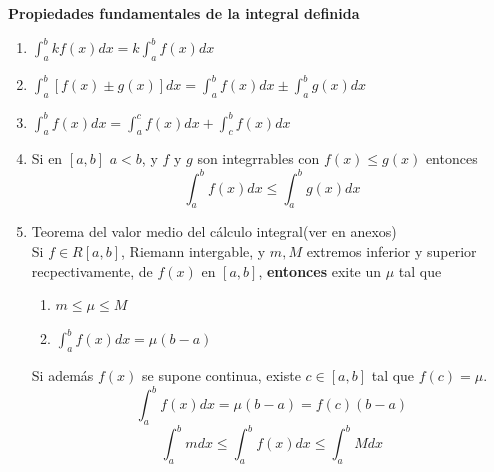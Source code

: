 \documentclass[10pt,twoside]{SelfArx} %
\begin{document}
\textbf{Propiedades fundamentales de la integral definida}\\
\begin{enumerate}
	\item $ \int_{a}^{b}kf(x)dx=k\int_{a}^{b}f(x)dx $
	\item $ \int_{a}^{b}[f(x)\pm g(x)]dx=\int_{a}^{b}f(x)dx\pm \int_{a}^{b}g(x)dx $
	\item $ \int_{a}^{b}f(x)dx=\int_{a}^{c}f(x)dx+\int_{c}^{b}f(x)dx $
	\item  Si en $ [a,b] $ $ a<b $, y $ f $ y $ g $ son integrrables con $ f(x)\leq g(x) $ entonces
	\[ \int_{a}^{b}f(x)dx\leq \int_{a}^{b}g(x)dx \]
	\item Teorema del valor medio del cálculo integral(ver en anexos) \\
	Si $ f\in R[a,b] $, Riemann intergable, y $ m,M $ extremos inferior y superior recpectivamente, de $ f(x) $ en $ [a,b] $,
	\textbf{entonces} exite un $ \mu $ tal que 
	\begin{enumerate}
		\item $ m\leq\mu\leq M $
		\item $ \int_{a}^{b}f(x)dx=\mu(b-a) $
	\end{enumerate}
	Si además $ f(x) $ se supone continua, existe $ c\in[a,b] $ tal que $ f(c)=\mu $.
\begin{equation}
	\int_{a}^{b}f(x)dx=\mu(b-a)=f(c)(b-a)
\end{equation}
	\begin{equation}
\int_{a}^{b}mdx\leq\int_{a}^{b}f(x)dx\leq\int_{a}^{b}Mdx
	\end{equation}
\end{enumerate}
\end{document}
